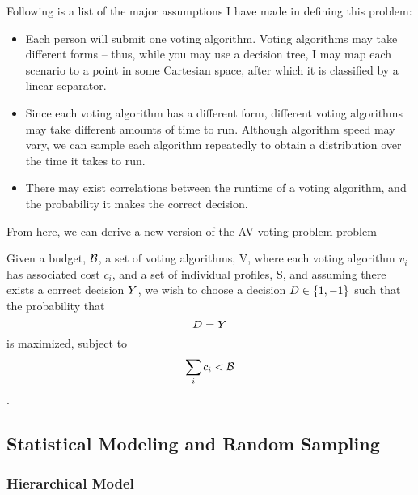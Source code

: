 Following is a list of the major assumptions I have made in defining this problem:

\begin{itemize}
\item Each person will submit one voting algorithm. Voting algorithms may take different forms -- thus, while you may use a decision tree, I may map each scenario to a point in some Cartesian space, after which it is classified by a linear separator.

\item Since each voting algorithm has a different form, different voting algorithms may take different amounts of time to run. Although algorithm speed may vary, we can sample each algorithm repeatedly to obtain a distribution over the time it takes to run.

\item There may exist correlations between the runtime of a voting algorithm, and the probability it makes the correct decision.

\end{itemize}

From here, we can derive a new version of the AV voting problem problem

\begin{definition}
Given a budget, $\mathcal{B}$, a set of voting algorithms, V, where each voting algorithm $v_i$ has associated cost $c_i$, and a set of individual profiles, S, and assuming there exists a correct decision $Y$, we wish to choose a decision $D \in \{1,-1\}$ such that the probability that $$D = Y$$ is maximized, subject to $$ \sum_{i} c_i < \mathcal{B}$$.
\end{definition} 

\subsection{Statistical Modeling and Random Sampling}
 
 \subsubsection{Hierarchical Model}
 
